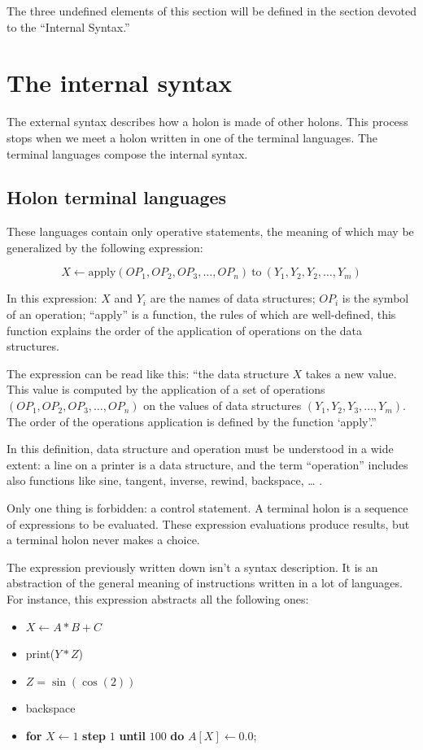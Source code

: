 \documentclass[openany,nobib]{tufte-book}
\newcommand{\kw}[1]{{\bf #1}}
\begin{document}
The three undefined elements of this section will be defined in the section
devoted to the ``Internal Syntax.''

\section{The internal syntax}

The external syntax describes how a holon is made of other holons. This process
stops when we meet a holon written in one of the terminal languages. The
terminal languages compose the internal syntax.

\subsection{Holon terminal languages}
\label{sec:holon-terminal-languages}

These languages contain only operative statements, the meaning of which may be
generalized by the following expression:

$$X \gets \mathrm{apply}(OP_1,OP_2,OP_3,\ldots ,OP_n)\ \mathrm{to}\
(Y_1,Y_2,Y_2,\ldots,Y_m)$$

In this expression: $X$ and $Y_i$ are the names of data structures; $OP_i$ is
the symbol of an operation; ``apply'' is a function, the rules of which are
well-defined, this function explains the order of the application of operations
on the data structures.

The expression can be read like this: ``the data structure $X$ takes a new
value. This value is computed by the application of a set of operations
$(OP_1,OP_2,OP_3,\ldots,OP_n)$ on the values of data structures
$(Y_1,Y_2,Y_3,\ldots,Y_m)$. The order of the operations application is defined
by the function `apply'.''

In this definition, data structure and operation must be understood in a wide
extent: a line on a printer is a data structure, and the term ``operation''
includes also functions like  sine, tangent, inverse, rewind, backspace, \dots
.

Only one thing is forbidden: a control statement. A terminal holon is a
sequence of expressions to be evaluated. These expression evaluations produce
results, but a terminal holon never makes a choice.

The expression previously written down isn't a syntax description. It is an
abstraction of the general meaning of instructions written in a lot of
languages. For instance, this expression abstracts all the following ones:
\begin{itemize}
    \item[] $X \gets A*B+C$
    \item[] print($Y*Z$)
    \item[] $Z = \sin ( \cos(2)) $
    \item[] backspace
    \item[] \kw{for} $X \gets 1$ \kw{step} $1$ \kw{until} $100$ \kw{do}
$A[X]\gets 0.0;$
\end{itemize}
\end{document}

